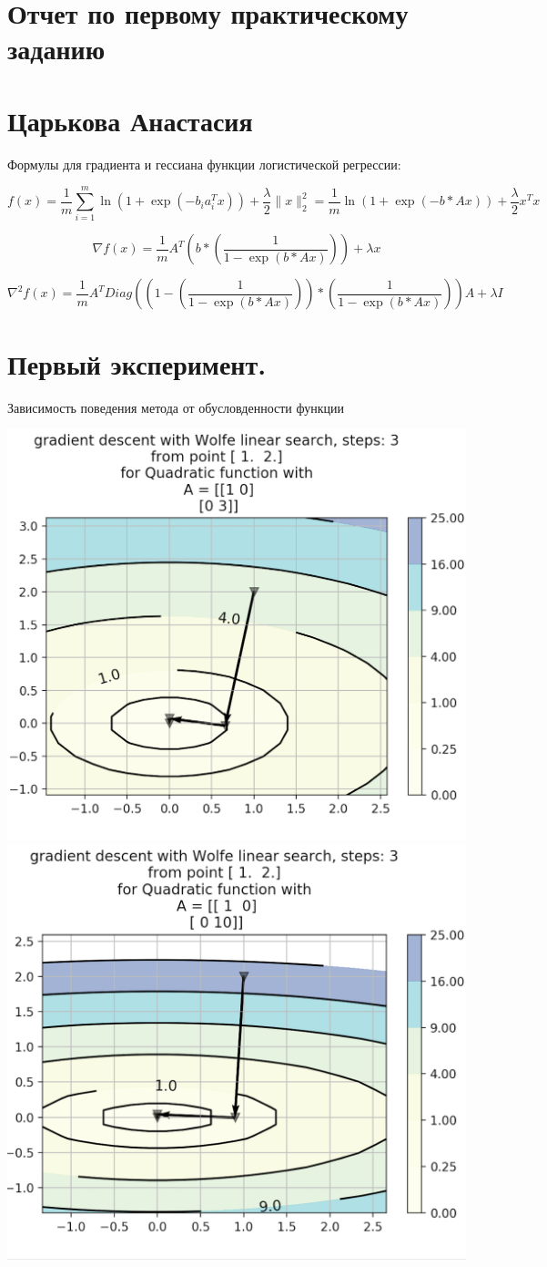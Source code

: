 \documentclass{article}
\theoremstyle{definition}
\theoremstyle{remark}
\newcommand{\lfrac} [2] {\displaystyle \frac{#1}{#2}}
\begin{document}
\section*{Отчет по первому практическому заданию}
\section*{Царькова Анастасия}

Формулы для градиента и гессиана функции логистической регрессии:

$$
f(x) = \lfrac{1}{m} \sum_{i = 1}^m \ln(1 + \exp(-b_ia_i^Tx)) + \lfrac{\lambda}{2} \|x\|_2^2 = \lfrac{1}{m} \ln(1 + \exp(-b * Ax)) + \lfrac{\lambda}{2} x^Tx
$$

$$
\nabla f(x) = \lfrac{1}{m} A^T \left(b * \left(\lfrac{1}{1 - \exp(b * Ax)} \right)\right) + \lambda x
$$

$$
\nabla^2 f(x) = \lfrac{1}{m} A^T Diag\left(\left(1 - \left(\lfrac{1}{1 - \exp(b * Ax)} \right)\right) * \left(\lfrac{1}{1 - \exp(b * Ax)} \right)\right)A + \lambda I
$$


\section{Первый эксперимент.}

Зависимость поведения метода от обусловденности функции

\includegraphics[width=0.5 \textwidth]{11.png}
\includegraphics[width=0.5 \textwidth]{12.png}
\end{document}
